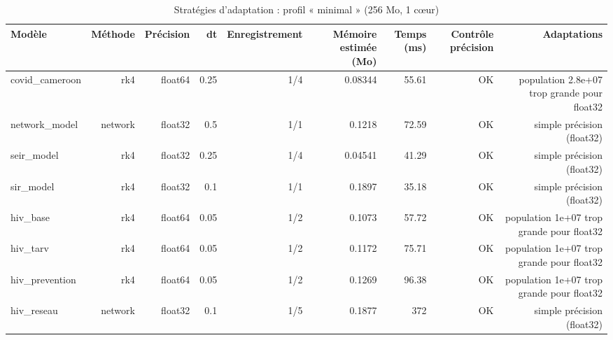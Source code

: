 \begin{table}[htbp]
\centering
\small
\caption{Stratégies d'adaptation : profil « minimal » (256 Mo, 1 cœur)}
\label{tab:bench-b6}
\begin{tabular}{lrrrrrrrr}
\toprule
Modèle & Méthode & Précision & dt & Enregistrement & Mémoire estimée (Mo) & Temps (ms) & Contrôle précision & Adaptations \\
\midrule
covid\_cameroon & rk4 & float64 & 0.25 & 1/4 & 0.08344 & 55.61 & OK & population 2.8e+07 trop grande pour float32  \\
network\_model & network & float32 & 0.5 & 1/1 & 0.1218 & 72.59 & OK & simple précision (float32)  \\
seir\_model & rk4 & float32 & 0.25 & 1/4 & 0.04541 & 41.29 & OK & simple précision (float32)  \\
sir\_model & rk4 & float32 & 0.1 & 1/1 & 0.1897 & 35.18 & OK & simple précision (float32)  \\
hiv\_base & rk4 & float64 & 0.05 & 1/2 & 0.1073 & 57.72 & OK & population 1e+07 trop grande pour float32  \\
hiv\_tarv & rk4 & float64 & 0.05 & 1/2 & 0.1172 & 75.71 & OK & population 1e+07 trop grande pour float32  \\
hiv\_prevention & rk4 & float64 & 0.05 & 1/2 & 0.1269 & 96.38 & OK & population 1e+07 trop grande pour float32  \\
hiv\_reseau & network & float32 & 0.1 & 1/5 & 0.1877 & 372 & OK & simple précision (float32)  \\
\bottomrule
\end{tabular}
\end{table}
